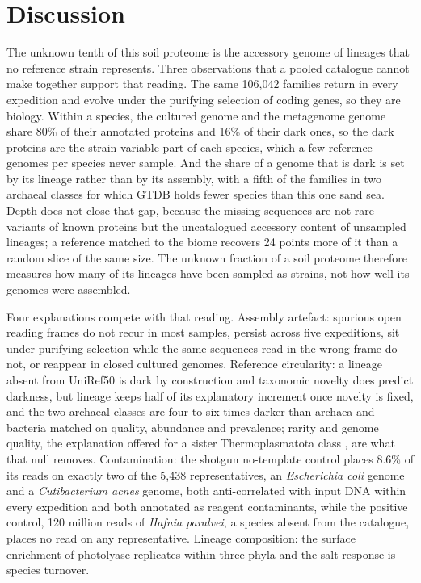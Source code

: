 \documentclass[11pt]{article}
\begin{document}
\section*{Discussion}

The unknown tenth of this soil proteome is the accessory genome of lineages that no reference
strain represents. Three observations that a pooled catalogue cannot make together support that
reading. The same 106{,}042 families return in every expedition and evolve under the purifying
selection of coding genes, so they are biology. Within a species, the cultured genome and the
metagenome genome share 80\% of their annotated proteins and 16\% of their dark ones, so the dark
proteins are the strain-variable part of each species, which a few reference genomes per species
never sample. And the share of a genome that is dark is set by its lineage rather than by its
assembly, with a fifth of the families in two archaeal classes for which GTDB holds fewer species
than this one sand sea. Depth does not close that gap, because the missing sequences are not rare
variants of known proteins but the uncatalogued accessory content of unsampled lineages; a
reference matched to the biome recovers 24 points more of it than a random slice of the same size.
The unknown fraction of a soil proteome therefore measures how many of its lineages have been
sampled as strains, not how well its genomes were assembled.

Four explanations compete with that reading. Assembly artefact: spurious open reading frames do not
recur in most samples, persist across five expeditions, sit under purifying selection while the same
sequences read in the wrong frame do not, or reappear in closed cultured genomes. Reference
circularity: a lineage absent from UniRef50 is dark by construction and taxonomic novelty does
predict darkness, but lineage keeps half of its explanatory increment once novelty is fixed, and the
two archaeal classes are four to six times darker than archaea and bacteria matched on quality,
abundance and prevalence; rarity and genome quality, the explanation offered for a sister
Thermoplasmatota class \citep{maeke2025thermoplasmatota}, are what that null removes. Contamination:
the shotgun no-template control places 8.6\% of its reads on exactly two of the 5{,}438
representatives, an \emph{Escherichia coli} genome and a \emph{Cutibacterium acnes} genome, both
anti-correlated with input DNA within every expedition and both annotated as reagent contaminants,
while the positive control, 120 million reads of \emph{Hafnia paralvei}, a species absent from the
catalogue, places no read on any representative. Lineage composition: the surface enrichment of
photolyase replicates within three phyla and the salt response is species turnover.
\end{document}
